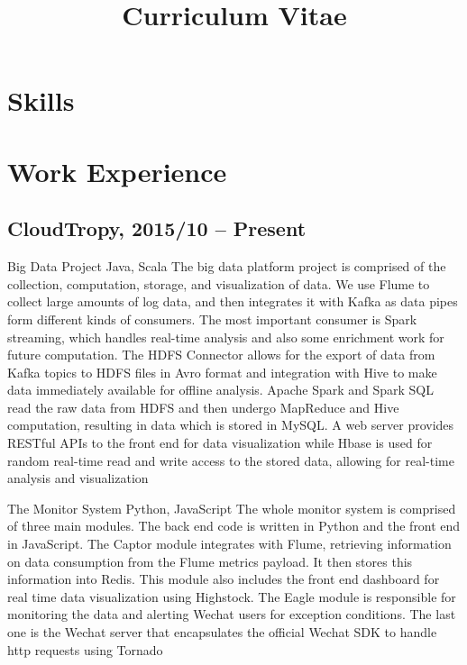 \documentclass[11pt,a4paper]{moderncv}
\title{Curriculum Vitae}
\begin{document}
\maketitle

\section{Skills}

\section{Work Experience}
\subsection{CloudTropy, 2015/10 -- Present}
\cventry{}
{Big Data Project}
{Java, Scala}
{}{}
{
The big data platform project is comprised of the collection, computation, storage, and visualization of data. We use Flume to collect large amounts of log data, and then integrates it with Kafka as data pipes form different kinds of consumers. The most important consumer is Spark streaming, which handles real-time analysis and also some enrichment work for future computation. The HDFS Connector allows for the export of data from Kafka topics to HDFS files in Avro format and integration with Hive to make data immediately available for offline analysis. Apache Spark and Spark SQL read the raw data from HDFS and then undergo MapReduce and Hive computation, resulting in data which is stored in MySQL. A web server provides RESTful APIs to the front end for data visualization while Hbase is used for random real-time read and write access to the stored data, allowing for real-time analysis and visualization
}

\vspace*{0.2\baselineskip}
\cventry{}
{The Monitor System}
{Python, JavaScript}
{}{}
{
The whole monitor system is comprised of three main modules. The back end code is written in Python and the front end in JavaScript. The Captor module integrates with Flume, retrieving information on data consumption from the Flume metrics payload. It then stores this information into Redis. This module also includes the front end dashboard for real time data visualization using Highstock. The Eagle module is responsible for monitoring the data and alerting Wechat users for exception conditions. The last one is the Wechat server that encapsulates the official Wechat SDK to handle http requests using Tornado
}
\end{document}
